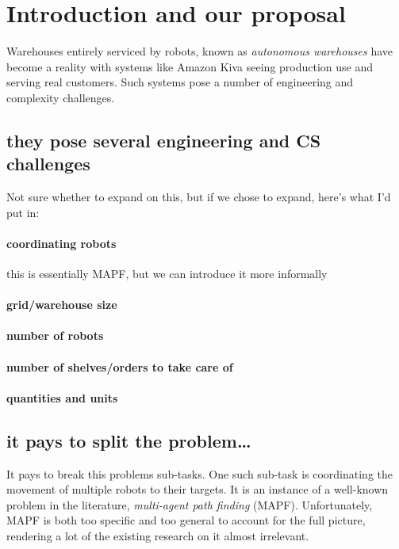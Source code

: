 \section{Introduction and our proposal}
\label{sec:orgaf30ac5}
Warehouses entirely serviced by robots, known as \emph{autonomous warehouses} \cite{wurman2008coordinating} have become a reality with systems like Amazon Kiva \cite{li2016design} seeing production use and serving real customers.
Such systems pose a number of engineering and complexity challenges.
\subsection{they pose several engineering and CS challenges}
\label{sec:org7e55105}
Not sure whether to expand on this, but if we chose to expand, here's what I'd put in:
\paragraph{coordinating robots}
\label{sec:org33195a7}
this is essentially MAPF, but we can introduce it more informally
\paragraph{grid/warehouse size}
\label{sec:orgdfb8b2a}
\paragraph{number of robots}
\label{sec:org12961cb}
\paragraph{number of shelves/orders to take care of}
\label{sec:orge2526f1}
\paragraph{quantities and units}
\label{sec:org948b6c3}
\subsection{it pays to split the problem\ldots{}}
\label{sec:org05ff91e}
It pays to break this problems sub-tasks.
 One such sub-task is coordinating the movement of multiple robots to their targets.
 It is an instance of a well-known problem in the literature, \emph{multi-agent path finding} (MAPF).
 Unfortunately, MAPF is both too specific and too general to account for the full picture, rendering a lot of the existing research on it almost irrelevant.

